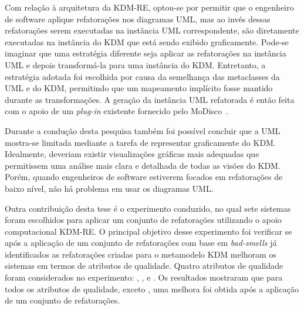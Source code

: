 Com relação à arquitetura da KDM-RE, optou-se por permitir que o engenheiro de software aplique refatorações nos diagramas UML, mas ao invés dessas refatorações serem executadas na instância UML correspondente, são diretamente executadas na instância do KDM que está sendo exibido graficamente. Pode-se imaginar que uma estratégia diferente seja aplicar as refatorações na instância UML e depois transformá-la para uma instância do KDM. Entretanto, a estratégia adotada foi escolhida por causa da semelhança das metaclasses da UML e do KDM, permitindo que um mapeamento implícito fosse mantido durante as transformações. A geração da instância UML refatorada é então feita com o apoio de um \textit{plug-in} existente fornecido pelo MoDisco~\cite{Bruneliere_2010MODISCO}.


Durante a condução desta pesquisa também foi possível concluir que a UML mostra-se limitada mediante a tarefa de representar graficamente do KDM. Idealmente, deveriam existir visualizações gráficas mais adequadas que permitissem uma análise mais clara e detalhada de todas as visões do KDM. Porém, quando engenheiros de software estiverem focados em refatorações de baixo nível, não há problema em usar os diagramas UML. 

Outra contribuição desta tese é o experimento conduzido, no qual sete sistemas foram escolhidos para aplicar um conjunto de refatorações utilizando o apoio computacional KDM-RE. O principal objetivo desse experimento foi verificar se após a aplicação de um conjunto de refatorações com base em \textit{bad-smells} já identificados as refatorações criadas para o metamodelo KDM melhoram os sistemas em termos de atributos de qualidade. Quatro atributos de qualidade foram considerados no experimento: , ,  e . Os resultados mostraram que para todos os atributos de qualidade, exceto , uma melhora foi obtida após a aplicação de um conjunto de refatorações.


